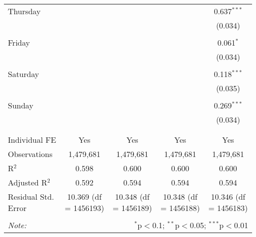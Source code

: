 \documentclass[
]{article}
\begin{document}
\begin{table}[!htbp]
{\begin{tabular}{@{\extracolsep{5pt}}lcccc}
 Thursday &  &  &  & 0.637$^{***}$ \\ 
  &  &  &  & (0.034) \\ 
  & & & & \\ 
 Friday &  &  &  & 0.061$^{*}$ \\ 
  &  &  &  & (0.034) \\ 
  & & & & \\ 
 Saturday &  &  &  & 0.118$^{***}$ \\ 
  &  &  &  & (0.035) \\ 
  & & & & \\ 
 Sunday &  &  &  & 0.269$^{***}$ \\ 
  &  &  &  & (0.034) \\ 
  & & & & \\ 
\hline \\[-1.8ex] 
Individual FE & Yes & Yes & Yes & Yes \\ 
Observations & 1,479,681 & 1,479,681 & 1,479,681 & 1,479,681 \\ 
R$^{2}$ & 0.598 & 0.600 & 0.600 & 0.600 \\ 
Adjusted R$^{2}$ & 0.592 & 0.594 & 0.594 & 0.594 \\ 
Residual Std. Error & 10.369 (df = 1456193) & 10.348 (df = 1456189) & 10.348 (df = 1456188) & 10.346 (df = 1456183) \\ 
\hline 
\hline \\[-1.8ex] 
\textit{Note:}  & \multicolumn{4}{r}{$^{*}$p$<$0.1; $^{**}$p$<$0.05; $^{***}$p$<$0.01} \\ 
\end{tabular}
} 
\end{table} 
\newpage
\end{document}
